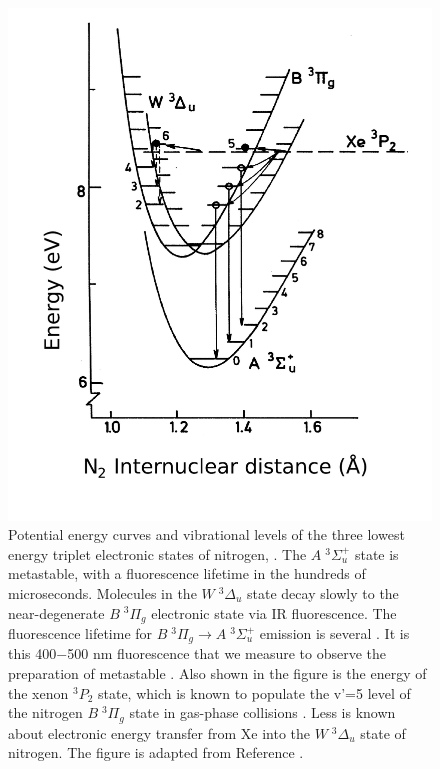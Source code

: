 \begin{figure}
  \caption{Potential energy curves and vibrational levels of the three
    lowest energy triplet electronic states of nitrogen, .  The
    $A \; ^3\Sigma_u^+$ state is metastable, with a fluorescence
    lifetime in the hundreds of microseconds.  Molecules in the $W \;
    ^3\Delta_u$ state decay slowly to the near-degenerate $B \;
    ^3\Pi_g$ electronic state via IR fluorescence.  The fluorescence
    lifetime for $B \; ^3\Pi_g \rightarrow A \; ^3\Sigma_u^+$ emission
    is several \microsec. It is this 400$-$500 nm fluorescence that we
    measure to observe the preparation of metastable .  Also
    shown in the figure is the energy of the xenon $^3P_2$ state,
    which is known to populate the v'=5 level of the nitrogen $B \;
    ^3\Pi_g$ state in gas-phase collisions \cite{krumpelmann87}.  Less
    is known about electronic energy transfer from Xe into the $W \;
    ^3\Delta_u$ state of nitrogen.  The figure is adapted from
    Reference \cite{krumpelmann-thesis}.}
  \label{fig:n2curves}
  \centering
  \includegraphics[width=5in]{n2curves.pdf}
\end{figure}

